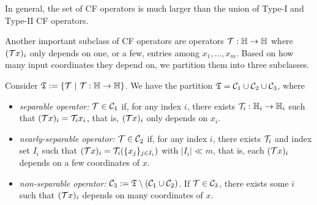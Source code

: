 In general, the set of CF operators is much larger than the union of Type-I and Type-II CF operators.

Another important subclass of CF operators are operators ${\mathcal{T}}:\mathbb{H}\to\mathbb{H}$ where   $({\mathcal{T}} x)_i$ only depends on one, or a few, entries among $x_1,\ldots,x_m$. Based on how many input coordinates they depend on, we partition them into three subclasses.
 \DIFdelbegin %

\DIFdelend \begin{definition}\label{def:sep-op} Consider $\mathfrak{T}:=\{{\mathcal{T}} ~|~{\mathcal{T}}:\mathbb{H}\to\mathbb{H}\}$. We have the partition $\mathfrak{T}={\mathcal{C}}_1\cup{\mathcal{C}}_2\cup{\mathcal{C}}_3$, where
\begin{itemize}
\item \emph{separable operator:} ${\mathcal{T}}\in{\mathcal{C}}_1$ if, for any index $i$, there exists ${\mathcal{T}}_i: \mathbb{H}_i \rightarrow \mathbb{H}_i$ such that $({\mathcal{T}} x)_i = {\mathcal{T}}_i x_i$, that is,   $({\mathcal{T}} x)_i$ only depends on $x_i$.
\item \emph{nearly-separable operator:} ${\mathcal{T}}\in {\mathcal{C}}_2$ if, for any index $i$, there exists ${\mathcal{T}}_i$ and index set $I_i$ such that $({\mathcal{T}} x)_i = {\mathcal{T}}_i(\{x_j\}_{j\in I_i})$ with $|I_i| \ll m$, that is, each $({\mathcal{T}} x)_i$ depends on a few  coordinates of $x$.
\item \emph{non-separable operator:} ${\mathcal{C}}_3:=\mathfrak{T}\setminus({\mathcal{C}}_1\cup {\mathcal{C}}_2)$. If ${\mathcal{T}}\in{\mathcal{C}}_3$, there exists some  $i$ such that $({\mathcal{T}} x)_i$ depends on many coordinates of $x$.
\end{itemize}
\end{definition}


